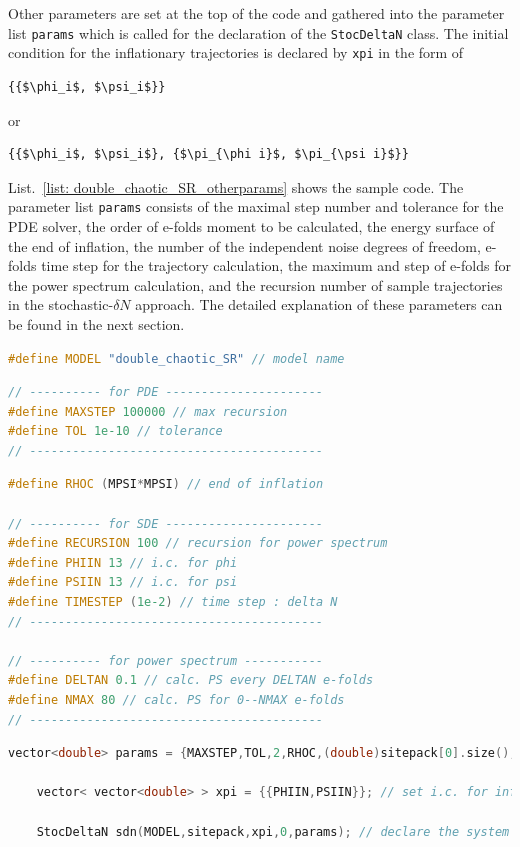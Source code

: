 \documentclass[aps, prd
, preprint
, nofootinbib 
, notitlepage
, superscriptaddress
, longbibliography
]{revtex4-1}
\begin{document}
Other parameters are set at the top of the code and gathered into the parameter list \texttt{params} which is called for the declaration of the \texttt{StocDeltaN} class. The initial condition for the inflationary trajectories is declared by \texttt{xpi} in the form of
\begin{lstlisting}[numbers = none, mathescape]
{{$\phi_i$, $\psi_i$}}    
\end{lstlisting}
or
\begin{lstlisting}[numbers = none, mathescape]
{{$\phi_i$, $\psi_i$}, {$\pi_{\phi i}$, $\pi_{\psi i}$}}
\end{lstlisting}
List.~\ref{list: double_chaotic_SR_otherparams} shows the sample code. The parameter list \texttt{params} consists of the maximal step number and tolerance for the PDE solver, the order of e-folds moment to be calculated, the energy surface of the end of inflation, the number of the independent noise degrees of freedom, e-folds time step for the trajectory calculation, the maximum and step of e-folds for the power spectrum calculation, and the recursion number of sample trajectories in the stochastic-$\delta N$ approach. The detailed explanation of these parameters can be found in the next section.

\begin{lstlisting}[language = C++, caption={\textit{sample/double\_chaotic\_SR.cpp}}, label=list: double_chaotic_SR_otherparams, firstnumber = 4]
#define MODEL "double_chaotic_SR" // model name
\end{lstlisting}
\begin{lstlisting}[language = C++, firstnumber = 15]
// ---------- for PDE ----------------------
#define MAXSTEP 100000 // max recursion
#define TOL 1e-10 // tolerance
// -----------------------------------------
\end{lstlisting}
\begin{lstlisting}[language = C++, firstnumber = 25]
#define RHOC (MPSI*MPSI) // end of inflation

// ---------- for SDE ----------------------
#define RECURSION 100 // recursion for power spectrum
#define PHIIN 13 // i.c. for phi
#define PSIIN 13 // i.c. for psi
#define TIMESTEP (1e-2) // time step : delta N
// -----------------------------------------

// ---------- for power spectrum -----------
#define DELTAN 0.1 // calc. PS every DELTAN e-folds
#define NMAX 80 // calc. PS for 0--NMAX e-folds
// -----------------------------------------
\end{lstlisting}
\begin{lstlisting}[language = C++, firstnumber = 76]
    vector<double> params = {MAXSTEP,TOL,2,RHOC,(double)sitepack[0].size(),TIMESTEP,NMAX,DELTAN,RECURSION}; // set paramters

    vector< vector<double> > xpi = {{PHIIN,PSIIN}}; // set i.c. for inflationary trajectories

    StocDeltaN sdn(MODEL,sitepack,xpi,0,params); // declare the system
\end{lstlisting}
\end{document}

